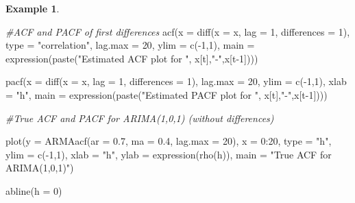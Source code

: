 \documentclass[
]{book}
\newenvironment{Shaded}{\begin{snugshade}}{\end{snugshade}}
\newcommand{\AttributeTok}[1]{\textcolor[rgb]{0.77,0.63,0.00}{#1}}
\newcommand{\CommentTok}[1]{\textcolor[rgb]{0.56,0.35,0.01}{\textit{#1}}}
\newcommand{\DecValTok}[1]{\textcolor[rgb]{0.00,0.00,0.81}{#1}}
\newcommand{\FloatTok}[1]{\textcolor[rgb]{0.00,0.00,0.81}{#1}}
\newcommand{\FunctionTok}[1]{\textcolor[rgb]{0.00,0.00,0.00}{#1}}
\newcommand{\NormalTok}[1]{#1}
\newcommand{\OtherTok}[1]{\textcolor[rgb]{0.56,0.35,0.01}{#1}}
\newcommand{\SpecialCharTok}[1]{\textcolor[rgb]{0.00,0.00,0.00}{#1}}
\newcommand{\StringTok}[1]{\textcolor[rgb]{0.31,0.60,0.02}{#1}}
\theoremstyle{definition}
\theoremstyle{definition}
\newtheorem{example}{Example}[chapter]
\theoremstyle{definition}
\theoremstyle{definition}
\theoremstyle{remark}
\begin{document}
\begin{example}
\begin{Shaded}
\begin{Highlighting}[]
\CommentTok{\#ACF and PACF of first differences}
\FunctionTok{acf}\NormalTok{(}\AttributeTok{x =} \FunctionTok{diff}\NormalTok{(}\AttributeTok{x =}\NormalTok{ x, }\AttributeTok{lag =} \DecValTok{1}\NormalTok{, }\AttributeTok{differences =} \DecValTok{1}\NormalTok{), }\AttributeTok{type =} 
      \StringTok{"correlation"}\NormalTok{, }\AttributeTok{lag.max =} \DecValTok{20}\NormalTok{, }\AttributeTok{ylim =} \FunctionTok{c}\NormalTok{(}\SpecialCharTok{{-}}\DecValTok{1}\NormalTok{,}\DecValTok{1}\NormalTok{), }\AttributeTok{main =} 
      \FunctionTok{expression}\NormalTok{(}\FunctionTok{paste}\NormalTok{(}\StringTok{"Estimated ACF plot for "}\NormalTok{, x[t],}\StringTok{"{-}"}\NormalTok{,x[t}\DecValTok{{-}1}\NormalTok{])))}

\FunctionTok{pacf}\NormalTok{(}\AttributeTok{x =} \FunctionTok{diff}\NormalTok{(}\AttributeTok{x =}\NormalTok{ x, }\AttributeTok{lag =} \DecValTok{1}\NormalTok{, }\AttributeTok{differences =} \DecValTok{1}\NormalTok{), lag.max }
      \OtherTok{=} \DecValTok{20}\NormalTok{, }\AttributeTok{ylim =} \FunctionTok{c}\NormalTok{(}\SpecialCharTok{{-}}\DecValTok{1}\NormalTok{,}\DecValTok{1}\NormalTok{), }\AttributeTok{xlab =} \StringTok{"h"}\NormalTok{, }\AttributeTok{main =} 
      \FunctionTok{expression}\NormalTok{(}\FunctionTok{paste}\NormalTok{(}\StringTok{"Estimated PACF plot for "}\NormalTok{, x[t],}\StringTok{"{-}"}\NormalTok{,x[t}\DecValTok{{-}1}\NormalTok{])))}
 
\CommentTok{\#True ACF and PACF for ARIMA(1,0,1) (without differences)}

\FunctionTok{plot}\NormalTok{(}\AttributeTok{y =} \FunctionTok{ARMAacf}\NormalTok{(}\AttributeTok{ar =} \FloatTok{0.7}\NormalTok{, }\AttributeTok{ma =} \FloatTok{0.4}\NormalTok{, }\AttributeTok{lag.max =} \DecValTok{20}\NormalTok{), }\AttributeTok{x =} 
      \DecValTok{0}\SpecialCharTok{:}\DecValTok{20}\NormalTok{, }\AttributeTok{type =} \StringTok{"h"}\NormalTok{, }\AttributeTok{ylim =} \FunctionTok{c}\NormalTok{(}\SpecialCharTok{{-}}\DecValTok{1}\NormalTok{,}\DecValTok{1}\NormalTok{), }\AttributeTok{xlab =} \StringTok{"h"}\NormalTok{, }\AttributeTok{ylab =} 
      \FunctionTok{expression}\NormalTok{(}\FunctionTok{rho}\NormalTok{(h)), }\AttributeTok{main =} \StringTok{"True ACF for }
\StringTok{      ARIMA(1,0,1)"}\NormalTok{)}

\FunctionTok{abline}\NormalTok{(}\AttributeTok{h =} \DecValTok{0}\NormalTok{)}


\end{Highlighting}
\end{Shaded}
\end{example}
\end{document}
